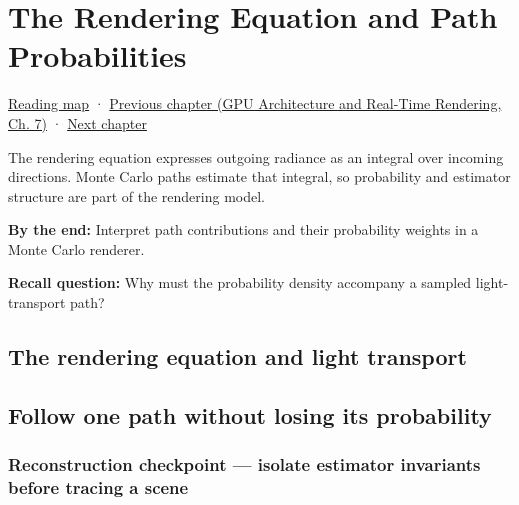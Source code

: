\chapter{The Rendering Equation and Path Probabilities}\label{03-visual-computing-i-ch007-the-rendering-equation-and-path-probabilities}\hypertarget{03-visual-computing-i-ch007}{}\label{stagechapter:03-visual-computing-i-ch007}

\hypertarget{03-visual-computing-i-ch007-the-rendering-equation-and-path-probabilities}{}

\hyperref[volume-reading-map]{Reading map} · \href{../06-GPU-Architecture-and-Real-Time-Rendering/main.pdf\#nameddest=03-visual-computing-i-ch006-from-material-data-to-gpu-bindings}{Previous chapter (GPU Architecture and Real-Time Rendering, Ch. 7)} · \hyperref[03-visual-computing-i-ch008-sampling-directions-and-light-transport]{Next chapter}

The rendering equation expresses outgoing radiance as an integral over incoming directions. Monte Carlo paths estimate that integral, so probability and estimator structure are part of the rendering model.

\textbf{By the end:} Interpret path contributions and their probability weights in a Monte Carlo renderer.

\textbf{Recall question:} Why must the probability density accompany a sampled light-transport path?

\section{The rendering equation and light transport}\label{03-visual-computing-i-ch007-the-rendering-equation-and-light-transport}

\hypertarget{03-visual-computing-i-ch007-the-rendering-equation-and-light-transport}{}

\section{Follow one path without losing its probability}\label{03-visual-computing-i-ch007-follow-one-path-without-losing-its-probability}

\hypertarget{03-visual-computing-i-ch007-follow-one-path-without-losing-its-probability}{}

\subsection{Reconstruction checkpoint --- isolate estimator invariants before tracing a scene}\label{03-visual-computing-i-ch007-reconstruction-checkpoint-isolate-estimator-invariants-before-tracing-a-scene}

